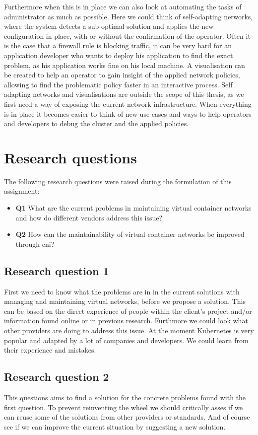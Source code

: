 Furthermore when this is in place we can also look at automating the tasks of administrator as much as possible. Here we could think of self-adapting networks, where the system detects a sub-optimal solution and applies the new configuration in place, with or without the confirmation of the operator. Often it is the case that a firewall rule is blocking traffic, it can be very hard for an application developer who wants to deploy his application to find the exact problem, as his application works fine on his local machine. A visualisation can be created to help an operator to gain insight of the applied network policies, allowing to find the problematic policy faster in an interactive process. Self adapting networks and visualisations are outside the scope of this thesis, as we first need a way of exposing the current network infrastructure. When everything is in place it becomes easier to think of new use cases and ways to help operators and developers to debug the cluster and the applied policies.


\section{Research questions}
The following research questions were raised during the formulation of this assignment:
\begin{itemize}
    \item \textbf{Q1} What are the current problems in maintaining virtual container networks and how do different vendors address this issue?
    \item \textbf{Q2} How can the maintainability of virtual container networks be improved through \gls{cni}?   
\end{itemize}

\subsection{Research question 1}
First we need to know what the problems are in in the current solutions with managing and maintaining virtual networks, before we propose a solution. This can be based on the direct experience of people within the client's project and/or information found online or in previous research. Furthmore we could look what other providers are doing to address this issue. At the moment Kubernetes is very popular and adapted by a lot of companies and developers. We could learn from their experience and mistakes.

\subsection{Research question 2}
This questions aims to find a solution for the concrete problems found with the first question. To prevent reinventing the wheel we should critically asses if we can reuse some of the solutions from other providers or standards. And of course see if we can improve the current situation by suggesting a new solution.
